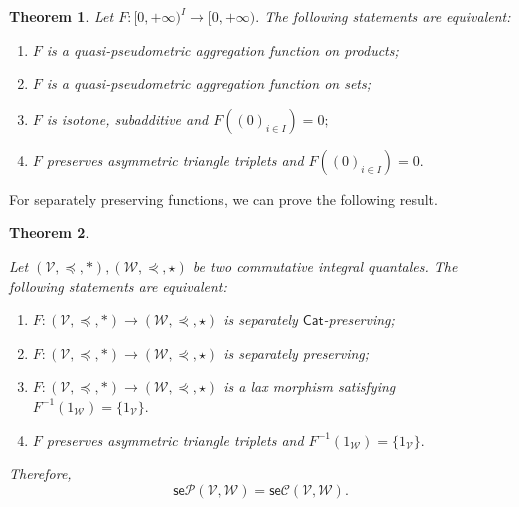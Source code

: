 \documentclass[11pt,a4paper]{amsart}
\newtheorem{theorem}{Theorem}[section]
\theoremstyle{definition}
\begin{document}
	\begin{theorem}\label{thm:qpmaf}
		Let $F:[0,+\infty)^I\to [0,+\infty).$ The following statements are equivalent:
		\begin{enumerate}[(1)]
			\item $F$ is a quasi-pseudometric aggregation function on products;
			\item $F$ is a quasi-pseudometric aggregation function on sets;
			\item $F$ is isotone, subadditive and $F((0)_{i\in I})=0;$
			\item $F$ preserves asymmetric triangle triplets and $F((0)_{i\in I})=0.$
		\end{enumerate}
	\end{theorem}
	
	
	
	For separately preserving functions, we can prove the following result.
	
	\begin{theorem}\label{thm:seplmq}
		
		Let $(\mathscr{V},\preceq,\ast),(\mathscr{W},\curlyeqprec,\star)$ be two commutative integral quantales. The following statements are equivalent:
		\begin{enumerate}[(1)]
			\item $F:(\mathscr{V},\preceq,\ast)\to(\mathscr{W},\curlyeqprec,\star)$ is separately $\mathsf{Cat}$-preserving; 
			\item  $F:(\mathscr{V},\preceq,\ast)\to(\mathscr{W},\curlyeqprec,\star)$ is separately preserving; 
			\item $F:(\mathscr{V},\preceq,\ast)\to(\mathscr{W},\curlyeqprec,\star)$ is a lax morphism satisfying $F^{-1}\left(1_{\mathscr{W}}\right)=\{1_{\mathscr{V}}\}.$
			\item $F$ preserves asymmetric triangle triplets and $F^{-1}\left(1_{\mathscr{W}}\right)=\{1_{\mathscr{V}}\}.$
		\end{enumerate}
		Therefore,
		$$\mathsf{se}\mathscr{P}(\mathscr{V},\mathscr{W})=\mathsf{se}\mathscr{C}(\mathscr{V},\mathscr{W}).$$
	\end{theorem}
	
\end{document}
